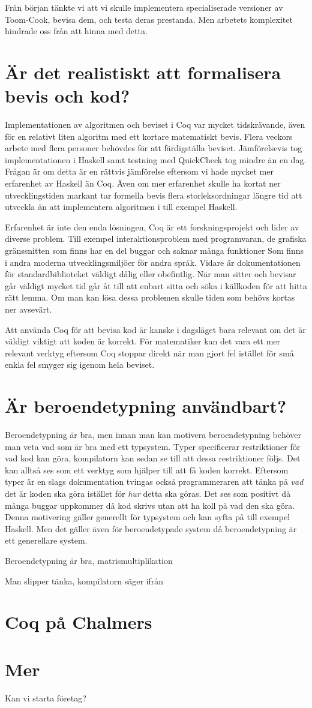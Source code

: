 Från början tänkte vi att vi skulle implementera specialiserade versioner av
Toom-Cook, bevisa dem, och testa deras prestanda. Men arbetets komplexitet
hindrade oss från att hinna med detta.

\section{Är det realistiskt att formalisera bevis och kod?}
Implementationen av algoritmen och beviset i Coq var mycket tidskrävande, även
för en relativt liten algoritm med ett kortare matematiskt bevis. Flera veckors
arbete med flera personer behövdes för att färdigställa beviset. Jämförelsevis
tog implementationen i Haskell samt testning med QuickCheck tog mindre än en
dag. Frågan är om detta är en rättvis jämförelse eftersom vi hade mycket mer
erfarenhet av Haskell än Coq. Även om mer erfarenhet skulle ha kortat ner
utvecklingstiden markant tar formella bevis flera storleksordningar längre tid
att utveckla än att implementera algoritmen i till exempel Haskell.

Erfarenhet är inte den enda lösningen, Coq är ett forskningsprojekt och lider
av diverse problem. Till exempel interaktionsproblem med programvaran, de
grafiska gränssnitten som finns har en del buggar och saknar många funktioner
Som finns i andra moderna utvecklingsmiljöer för andra språk. Vidare är
dokumentationen för standardbiblioteket väldigt dålig eller obefintlig. När man
sitter och bevisar går väldigt mycket tid går åt till att enbart sitta och söka
i källkoden för att hitta rätt lemma. Om man kan lösa dessa problemen skulle
tiden som behövs kortas ner avsevärt.

Att använda Coq för att bevisa kod är kanske i dagsläget bara relevant om det
är väldigt viktigt att koden är korrekt. För matematiker kan det vara ett mer
relevant verktyg eftersom Coq stoppar direkt när man gjort fel istället för små
enkla fel smyger sig igenom hela beviset.

\section{Är beroendetypning användbart?}
Beroendetypning är bra, men innan man kan motivera beroendetypning behöver man
veta vad som är bra med ett typsystem. Typer specificerar restriktioner för vad
kod kan göra, kompilatorn kan sedan se till att dessa restriktioner följs. Det
kan alltså ses som ett verktyg som hjälper till att få koden korrekt. Eftersom
typer är en slags dokumentation tvingas också programmeraren att tänka på
\emph{vad} det är koden ska göra istället för \emph{hur} detta ska göras. Det
ses som positivt då många buggar uppkommer då kod skrivs utan att ha koll på
vad den ska göra. Denna motivering gäller generellt för typsystem och kan syfta
på till exempel Haskell. Men det gäller även för beroendetypade system då
beroendetypning är ett generellare system.

Beroendetypning är bra, matrismultiplikation

Man slipper tänka, kompilatorn säger ifrån

\section{Coq på Chalmers}

\section{Mer}
Kan vi starta företag?
